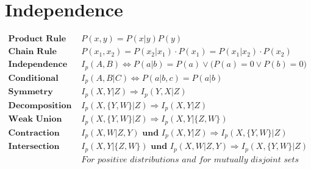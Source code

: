 \documentclass{article}
\newcommand{\prob}{\textit{P}}
\begin{document}
	\section*{Independence}
		\begin{align*}
			\textbf{Product Rule } & \prob(x,y) = \prob(x|y)\prob(y)\\
			\textbf{Chain Rule } & \prob (x_1, x_2) = \prob (x_2 | x_1) \cdot \prob(x_1) = \prob(x_1 | x_2) \cdot \prob (x_2)\\
			\textbf{Independence } & I_p(A,B) \Leftrightarrow \prob (a|b) = \prob(a) \vee \Big(\prob(a) = 0 \vee \prob(b) = 0\Big)\\
			\textbf{Conditional Independence } & I_p(A,B|C) \Leftrightarrow \prob(a|b,c) = \prob(a|b)\\
			\textbf{Symmetry } & I_p(X,Y|Z) \Rightarrow I_p(Y,X|Z)\\
			\textbf{Decomposition } & I_p(X, \{Y, W\}|Z) \Rightarrow I_p(X,Y|Z)\\
			\textbf{Weak Union } & I_p(X, \{Y, W\}|Z) \Rightarrow I_p(X, Y|\{Z, W \})& \\
			\textbf{Contraction } & I_p(X, W |Z, Y) \textbf{ und } I_p(X, Y|Z) \Rightarrow I_p(X, \{Y, W \}|Z)\\
			\textbf{Intersection } & I_p(X, Y|\{Z, W\}) \textbf{ und } I_p(X, W |Z, Y) \Rightarrow I_p(X, \{Y, W \}|Z)\\
			& \textit{For positive distributions and for mutually disjoint sets X, Y, Z, W}
		\end{align*}
\end{document}
